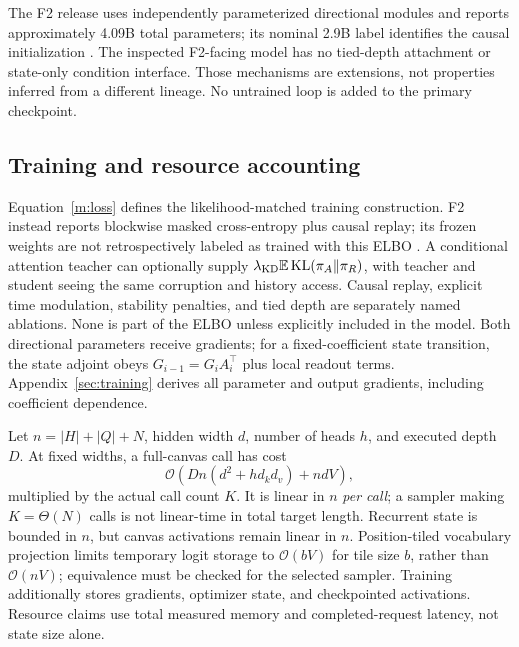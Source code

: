 \documentclass{article}
\theoremstyle{remark}\newtheorem{remark}[theorem]{Remark}
\newcommand{\E}{\mathbb E}
\newcommand{\KL}{\operatorname{KL}}
\begin{document}
The F2 release uses independently parameterized directional modules and reports approximately 4.09B total parameters; its nominal 2.9B label identifies the causal initialization \citep{f2release}. The inspected F2-facing model has no tied-depth attachment or state-only condition interface. Those mechanisms are extensions, not properties inferred from a different lineage. No untrained loop is added to the primary checkpoint.

\subsection{Training and resource accounting}
Equation~\eqref{m:loss} defines the likelihood-matched training construction. F2 instead reports blockwise masked cross-entropy plus causal replay; its frozen weights are not retrospectively labeled as trained with this ELBO \citep{f2release}. A conditional attention teacher can optionally supply $\lambda_{\rm KD}\E\KL(\pi_A\Vert\pi_R)$, with teacher and student seeing the same corruption and history access. Causal replay, explicit time modulation, stability penalties, and tied depth are separately named ablations. None is part of the ELBO unless explicitly included in the model. Both directional parameters receive gradients; for a fixed-coefficient state transition, the state adjoint obeys $G_{i-1}=G_iA_i^\top$ plus local readout terms. Appendix~\ref{sec:training} derives all parameter and output gradients, including coefficient dependence.

Let $n=|H|+|Q|+N$, hidden width $d$, number of heads $h$, and executed depth $D$. At fixed widths, a full-canvas call has cost
\begin{equation}
\mathcal O\!\left(Dn(d^2+h d_kd_v)+ndV\right),
\label{m:cost}
\end{equation}
multiplied by the actual call count $K$. It is linear in $n$ \emph{per call}; a sampler making $K=\Theta(N)$ calls is not linear-time in total target length. Recurrent state is bounded in $n$, but canvas activations remain linear in $n$. Position-tiled vocabulary projection limits temporary logit storage to $\mathcal O(bV)$ for tile size $b$, rather than $\mathcal O(nV)$; equivalence must be checked for the selected sampler. Training additionally stores gradients, optimizer state, and checkpointed activations. Resource claims use total measured memory and completed-request latency, not state size alone.
\end{document}
